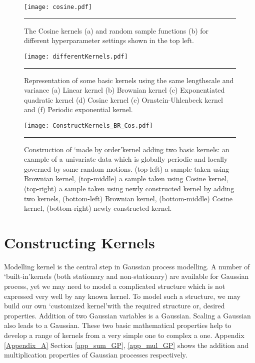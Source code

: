 \begin{figure}[t]
	\centering
		\texttt{[image: cosine.pdf]}
		\rule{35em}{0.5pt}
	\caption[The Cosine kernels and random sample functions]
		{The Cosine kernels (a) and random sample functions (b) for different hyperparameter settings shown in the top left.}
	\label{fig:cosine_covariance}
\end{figure}


\begin{figure}[t]
	\centering
		\texttt{[image: differentKernels.pdf]}
		\rule{35em}{0.5pt}
	\caption[Representation of some basic kernels ]
		{Representation of some basic kernels using the same lengthscale and variance (a) Linear kernel (b) Brownian kernel (c) Exponentiated quadratic kernel (d) Cosine kernel (e) Ornstein-Uhlenbeck kernel and (f) Periodic exponential kernel.}
	\label{fig:DifferentKernels}
\end{figure}

\begin{figure}[t]
	\centering
		\texttt{[image: ConstructKernels\_BR\_Cos.pdf]}
		\rule{35em}{0.5pt}
	\caption[Construction of a new kernel adding two basic kernels]
		{Construction of \lq made by order\rq kernel adding two basic kernels: an example of a univariate data which is globally periodic and locally governed by some random motions. (top-left) a sample taken using Brownian kernel, (top-middle) a sample taken using Cosine kernel, (top-right) a sample taken using newly constructed kernel by adding two kernels, (bottom-left) Brownian kernel, (bottom-middle) Cosine kernel, (bottom-right) newly constructed kernel.} 
	\label{fig:ConstructKernels_BR_Cos}
\end{figure}

\section{Constructing Kernels}

Modelling kernel is the central step in Gaussian process modelling. A number of \lq built-in\rq kernels (both stationary and non-stationary) are available for Gaussian process, yet we may need to model a complicated structure which is not expressed very well by any known kernel. To model such a structure, we may build our own \lq customized kernel\rq with the required structure or, desired properties. Addition of two Gaussian variables is a Gaussian. Scaling a Gaussian also leads to a Gaussian. These two basic mathematical properties help to develop a range of kernels from a very simple one to complex a one. Appendix \ref{Appendix_A} Section \ref{app_sum_GP}, \ref{app_mul_GP} shows the addition and multiplication properties of Gaussian processes respectively. 


